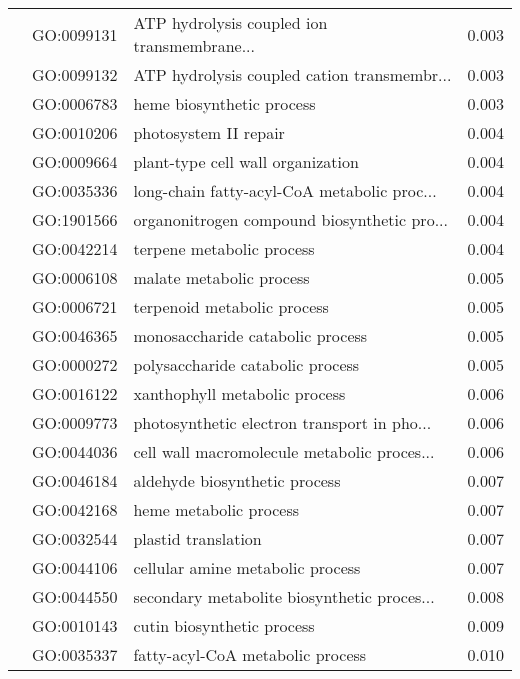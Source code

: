 \begin{longtable}{lllr}
   & GO:0099131 &  ATP hydrolysis coupled ion transmembrane... &         0.003 \\
   & GO:0099132 &  ATP hydrolysis coupled cation transmembr... &         0.003 \\
   & GO:0006783 &                    heme biosynthetic process &         0.003 \\
   & GO:0010206 &                        photosystem II repair &         0.004 \\
   & GO:0009664 &            plant-type cell wall organization &         0.004 \\
   & GO:0035336 &  long-chain fatty-acyl-CoA metabolic proc... &         0.004 \\
   & GO:1901566 &  organonitrogen compound biosynthetic pro... &         0.004 \\
   & GO:0042214 &                    terpene metabolic process &         0.004 \\
   & GO:0006108 &                     malate metabolic process &         0.005 \\
   & GO:0006721 &                  terpenoid metabolic process &         0.005 \\
   & GO:0046365 &             monosaccharide catabolic process &         0.005 \\
   & GO:0000272 &             polysaccharide catabolic process &         0.005 \\
   & GO:0016122 &                xanthophyll metabolic process &         0.006 \\
   & GO:0009773 &  photosynthetic electron transport in pho... &         0.006 \\
   & GO:0044036 &  cell wall macromolecule metabolic proces... &         0.006 \\
   & GO:0046184 &                aldehyde biosynthetic process &         0.007 \\
   & GO:0042168 &                       heme metabolic process &         0.007 \\
   & GO:0032544 &                          plastid translation &         0.007 \\
   & GO:0044106 &             cellular amine metabolic process &         0.007 \\
   & GO:0044550 &  secondary metabolite biosynthetic proces... &         0.008 \\
   & GO:0010143 &                   cutin biosynthetic process &         0.009 \\
   & GO:0035337 &             fatty-acyl-CoA metabolic process &         0.010 \\

\end{longtable}
